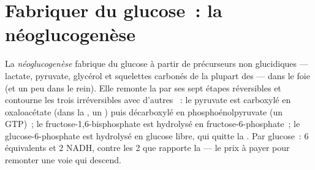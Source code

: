 \section{Fabriquer du glucose~: la néoglucogenèse}

\begin{definition}[Néoglucogenèse]\label{def:b1:biosyntheses-integration:gluconeogenesis}
La \emph{néoglucogenèse} fabrique du glucose à partir de précurseurs non
glucidiques --- lactate, pyruvate, glycérol et squelettes carbonés de la
plupart des  --- dans le foie (et un peu dans le rein).
Elle remonte la  par ses sept étapes réversibles et contourne
les trois irréversibles avec d'autres ~: le pyruvate est
carboxylé en oxaloacétate (dans la , un ) puis
décarboxylé en phosphoénolpyruvate (un GTP)~; le
fructose-1,6-bisphosphate est hydrolysé en fructose-6-phosphate~; le
glucose-6-phosphate est hydrolysé en glucose libre, qui quitte la
. Par glucose~: 6 équivalents  et 2 NADH, contre les 2  que
rapporte la  --- le prix à payer pour remonter une voie qui
descend.
\end{definition}

